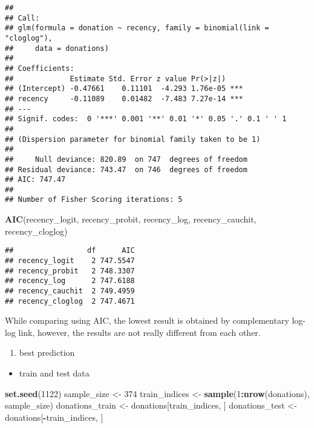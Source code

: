 \documentclass[
]{article}
\newenvironment{Shaded}{\begin{snugshade}}{\end{snugshade}}
\newcommand{\DecValTok}[1]{\textcolor[rgb]{0.00,0.00,0.81}{#1}}
\newcommand{\FunctionTok}[1]{\textcolor[rgb]{0.13,0.29,0.53}{\textbf{#1}}}
\newcommand{\NormalTok}[1]{#1}
\newcommand{\OtherTok}[1]{\textcolor[rgb]{0.56,0.35,0.01}{#1}}
\newcommand{\SpecialCharTok}[1]{\textcolor[rgb]{0.81,0.36,0.00}{\textbf{#1}}}
\providecommand{\tightlist}{%
  \setlength{\itemsep}{0pt}\setlength{\parskip}{0pt}}
\begin{document}
\begin{verbatim}
## 
## Call:
## glm(formula = donation ~ recency, family = binomial(link = "cloglog"), 
##     data = donations)
## 
## Coefficients:
##             Estimate Std. Error z value Pr(>|z|)    
## (Intercept) -0.47661    0.11101  -4.293 1.76e-05 ***
## recency     -0.11089    0.01482  -7.483 7.27e-14 ***
## ---
## Signif. codes:  0 '***' 0.001 '**' 0.01 '*' 0.05 '.' 0.1 ' ' 1
## 
## (Dispersion parameter for binomial family taken to be 1)
## 
##     Null deviance: 820.89  on 747  degrees of freedom
## Residual deviance: 743.47  on 746  degrees of freedom
## AIC: 747.47
## 
## Number of Fisher Scoring iterations: 5
\end{verbatim}

\begin{Shaded}
\begin{Highlighting}[]
\FunctionTok{AIC}\NormalTok{(recency\_logit, recency\_probit, recency\_log, recency\_cauchit, recency\_cloglog)}
\end{Highlighting}
\end{Shaded}

\begin{verbatim}
##                 df      AIC
## recency_logit    2 747.5547
## recency_probit   2 748.3307
## recency_log      2 747.6188
## recency_cauchit  2 749.4959
## recency_cloglog  2 747.4671
\end{verbatim}

While comparing using AIC, the lowest result is obtained by
complementary log-log link, however, the results are not really
different from each other.

\begin{enumerate}
\def\labelenumi{\alph{enumi}.}
\setcounter{enumi}{2}
\tightlist
\item
  best prediction
\end{enumerate}

\begin{itemize}
\tightlist
\item
  train and test data
\end{itemize}

\begin{Shaded}
\begin{Highlighting}[]
\FunctionTok{set.seed}\NormalTok{(}\DecValTok{1122}\NormalTok{)}
\NormalTok{sample\_size }\OtherTok{\textless{}{-}} \DecValTok{374}
\NormalTok{train\_indices }\OtherTok{\textless{}{-}} \FunctionTok{sample}\NormalTok{(}\DecValTok{1}\SpecialCharTok{:}\FunctionTok{nrow}\NormalTok{(donations), sample\_size)}
\NormalTok{donations\_train }\OtherTok{\textless{}{-}}\NormalTok{ donations[train\_indices, ]}
\NormalTok{donations\_test }\OtherTok{\textless{}{-}}\NormalTok{ donations[}\SpecialCharTok{{-}}\NormalTok{train\_indices, ]}
\end{Highlighting}
\end{Shaded}
\end{document}
